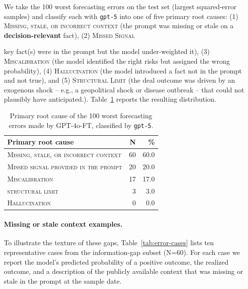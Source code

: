 \documentclass{article}
\theoremstyle{plain}
\theoremstyle{definition}
\theoremstyle{remark}
\begin{document}
We take the 100 worst forecasting errors on the test set (largest squared-error samples) and classify each with \texttt{gpt-5} into one of five primary root causes: (1) \textsc{Missing, stale, or incorrect context} (the prompt was missing or stale on a \textbf{decision-relevant} fact), (2) \textsc{Missed Signal} {key fact(s) were in the prompt but the model under-weighted it), (3) \textsc{Miscalibration} (the model identified the right risks but assigned the wrong probability), (4) \textsc{Hallucination} (the model introduced a fact not in the prompt and not true), and (5) \textsc{Structural Limit} (the deal outcome was driven by an exogenous shock -- e.g., a geopolitical shock or disease outbreak -- that could not plausibly have anticipated.). Table~\ref{tab:error-distribution} reports the resulting distribution.

\begin{table}[h]
\centering
\small
\begin{tabular}{lrr}
\toprule
\textbf{Primary root cause} & \textbf{N} & \textbf{\%} \\
\midrule
\textsc{Missing, stale, or incorrect context}   & 60 & 60.0 \\
\textsc{Missed signal provided in the prompt}     & 20 & 20.0 \\
\textsc{Miscalibration}     & 17 & 17.0 \\
\textsc{structural limit}  &  3 &  3.0 \\
\textsc{Hallucination}  &  0 &  0.0 \\

\midrule
\bottomrule
\end{tabular}
\caption{Primary root cause of the 100 worst forecasting errors made by GPT-4o-FT, classified by \texttt{gpt-5}.}
\label{tab:error-distribution}
\end{table}

\paragraph{Missing or stale context examples.}
To illustrate the texture of these gaps, Table~\ref{tab:error-cases} lists ten representative cases from the information-gap subset (N=60). For each case we report the model's predicted probability of a positive outcome, the realized outcome, and a description of the publicly available context that was missing or stale in the prompt at the sample date.

}
\end{document}
